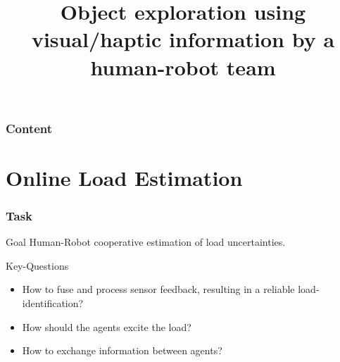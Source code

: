 \documentclass[student,noshadow]{ITRslides}
\title{Object exploration using visual/haptic information by a human-robot team}
\begin{document}
\begin{frame}
    \titlepage
\end{frame}

\begin{frame}
	\frametitle{Content}
	\tableofcontents
\end{frame}

\section{Online Load Estimation}
\begin{frame}
	\frametitle{Task}
	\begin{block}{Goal}
			Human-Robot cooperative estimation of load uncertainties.
	\end{block}
	\vspace{2mm}
	\begin{block}{Key-Questions}
			\begin{itemize}
				\item How to fuse and process sensor feedback, resulting in a reliable load-identification?
				\item How should the agents excite the load?
				\item How to exchange information between agents?
			\end{itemize}	   
	\end{block}	
\end{frame}
\end{document}
